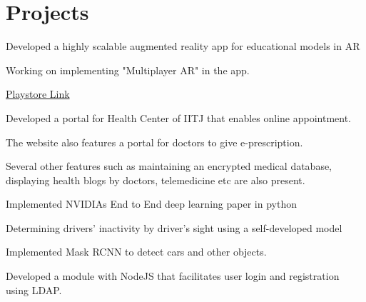 \documentclass[]{deedy-resume-openfont}
\begin{document}
\begin{minipage}[t]{0.66\textwidth}
\section{Projects}

\begin{tightemize}
\item Developed a highly scalable augmented reality app for educational models in AR
\item Working on implementing "Multiplayer AR" in the app.
\item \href{https://play.google.com/store/apps/details?id=co_in.ared}{Playstore Link \faExternalLink}
\end{tightemize}

\begin{tightemize}
\item Developed a portal for Health Center of IITJ that enables online appointment.\\
\item The website also features a portal for doctors to give e-prescription.\\
\item Several other features such as maintaining an encrypted medical database, displaying health blogs by doctors, telemedicine etc are also present.\\
\end{tightemize}


\begin{tightemize}
\item Implemented NVIDIAs End to End deep learning paper in python\\
\item Determining drivers' inactivity by driver's sight using a self-developed model\\
\item Implemented Mask RCNN to detect cars and other objects.\\
\end{tightemize}

\begin{tightemize}
\item Developed a module with NodeJS that facilitates user login and registration using LDAP.
\end{tightemize}



\end{minipage}
\end{document}
